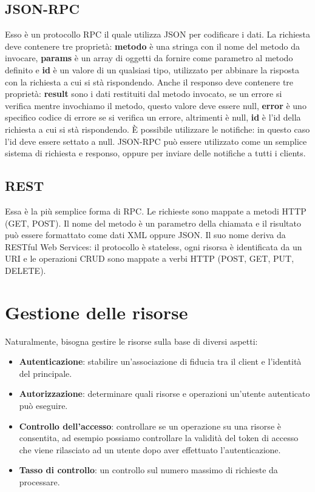 \subsection{JSON-RPC}
Esso è un protocollo RPC il quale utilizza JSON per codificare i dati. La richiesta deve contenere tre proprietà: \textbf{metodo} è una stringa con il nome del metodo da invocare, \textbf{params} è un array di oggetti da fornire come parametro al metodo definito e \textbf{id} è un valore di un qualsiasi tipo, utilizzato per abbinare la risposta con la richiesta a cui si stà rispondendo. Anche il responso deve contenere tre proprietà: \textbf{result} sono i dati restituiti dal metodo invocato, se un errore si verifica mentre invochiamo il metodo, questo valore deve essere null, \textbf{error} è uno specifico codice di errore se si verifica un errore, altrimenti è null, \textbf{id} è l'id della richiesta a cui si stà rispondendo. È possibile utilizzare le notifiche: in questo caso l'id deve essere settato a null. JSON-RPC può essere utilizzato come un semplice sistema di richiesta e responso, oppure per inviare delle notifiche a tutti i clients.

\subsection{REST}
Essa è la più semplice forma di RPC. Le richieste sono mappate a metodi HTTP (GET, POST). Il nome del metodo è un parametro della chiamata e il risultato può essere formattato come dati XML oppure JSON. Il suo nome deriva da RESTful Web Services: il protocollo è stateless, ogni risorsa è identificata da un URI e le operazioni CRUD sono mappate a verbi HTTP (POST, GET, PUT, DELETE).

\section{Gestione delle risorse}
Naturalmente, bisogna gestire le risorse sulla base di diversi aspetti:
\begin{itemize}
    \item \textbf{Autenticazione}: stabilire un'associazione di fiducia tra il client e l'identità del principale.
    \item \textbf{Autorizzazione}: determinare quali risorse e operazioni un'utente autenticato può eseguire.
    \item \textbf{Controllo dell'accesso}: controllare se un operazione su una risorse è consentita, ad esempio possiamo controllare la validità del token di accesso che viene rilasciato ad un utente dopo aver effettuato l'autenticazione.
    \item \textbf{Tasso di controllo}: un controllo sul numero massimo di richieste da processare.
\end{itemize}

